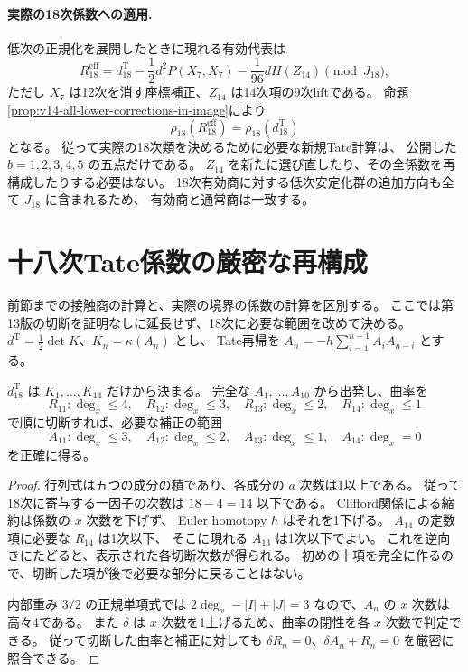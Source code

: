 \paragraph{実際の18次係数への適用.}
低次の正規化を展開したときに現れる有効代表は
\[
 R_{18}^{\mathrm{eff}}
 =d_{18}^{\mathrm T}
  -\frac12d^2P(X_7,X_7)-\frac1{96}dH(Z_{14})
 \pmod{J_{18}},
\]
ただし $X_7$ は12次を消す座標補正、$Z_{14}$ は14次項の9次liftである。
命題\ref{prop:v14-all-lower-corrections-in-image}により
\[
 \rho_{18}(R_{18}^{\mathrm{eff}})=\rho_{18}(d_{18}^{\mathrm T})
\]
となる。
従って実際の18次類を決めるために必要な新規Tate計算は、
公開した $b=1,2,3,4,5$ の五点だけである。
$Z_{14}$ を新たに選び直したり、その全係数を再構成したりする必要はない。
18次有効商に対する低次安定化群の追加方向も全て $J_{18}$ に含まれるため、
有効商と通常商は一致する。



\section{十八次Tate係数の厳密な再構成}
\label{sec:v14-tate-eighteenth}

前節までの接触商の計算と、実際の境界の係数の計算を区別する。
ここでは第13版の切断を証明なしに延長せず、18次に必要な範囲を改めて決める。
$d^{\mathrm T}=\tfrac12\det K$、$K_n=\kappa(A_n)$ とし、
Tate再帰を $A_n=-h\sum_{i=1}^{n-1}A_iA_{n-i}$ とする。

\begin{lemma}[十八次に必要な正確な切断]
\label{lem:v14-exact-fourteenth-truncation}
$d^{\mathrm T}_{18}$ は $K_1,\ldots,K_{14}$ だけから決まる。
完全な $A_1,\ldots,A_{10}$ から出発し、曲率を
\[
 R_{11}:\deg_x\le4,\quad
 R_{12}:\deg_x\le3,\quad
 R_{13}:\deg_x\le2,\quad
 R_{14}:\deg_x\le1
\]
で順に切断すれば、必要な補正の範囲
\[
 A_{11}:\deg_x\le3,\quad
 A_{12}:\deg_x\le2,\quad
 A_{13}:\deg_x\le1,\quad
 A_{14}:\deg_x=0
\]
を正確に得る。
\end{lemma}

\begin{proof}
行列式は五つの成分の積であり、各成分の $a$ 次数は1以上である。
従って18次に寄与する一因子の次数は $18-4=14$ 以下である。
Clifford関係による縮約は係数の $x$ 次数を下げず、
Euler homotopy $h$ はそれを1下げる。
$A_{14}$ の定数項に必要な $R_{14}$ は1次以下、
そこに現れる $A_{13}$ は1次以下でよい。
これを逆向きにたどると、表示された各切断次数が得られる。
初めの十項を完全に作るので、切断した項が後で必要な部分に戻ることはない。

内部重み $3/2$ の正規単項式では
$2\deg_x-|I|+|J|=3$ なので、$A_n$ の $x$ 次数は高々4である。
また $\delta$ は $x$ 次数を1上げるため、曲率の閉性を各 $x$ 次数で判定できる。
従って切断した曲率と補正に対しても
$\delta R_n=0$、$\delta A_n+R_n=0$ を厳密に照合できる。
\end{proof}

